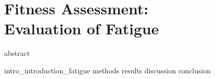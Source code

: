 \chapter{Fitness Assessment: \\ Evaluation of Fatigue}
\label{chapter:fatigue}
\glsresetall
{abstract}



\clearpage
{intro_introduction_fatigue}
{methods}
{results}
{discussion}
{conclusion}

